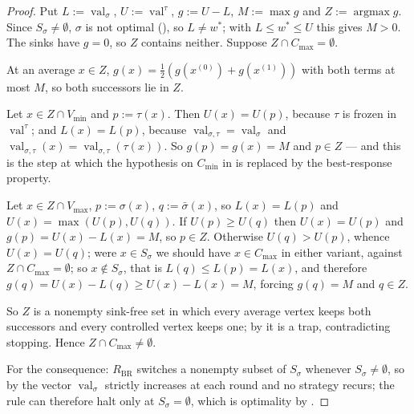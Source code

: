 \documentclass[11pt]{article}
\theoremstyle{plain}
\theoremstyle{definition}
\DeclareMathOperator{\val}{val}
\newcommand{\Vmax}{V_{\max}}
\newcommand{\Vmin}{V_{\min}}
\begin{document}
\begin{proof}
Put $L:=\val_\sigma$, $U:=\val^\tau$, $g:=U-L$, $M:=\max g$ and
$Z:=\operatorname{argmax}g$. Since $S_\sigma\ne\emptyset$, $\sigma$ is not
optimal (), so $L\ne w^\ast$; with
$L\le w^\ast\le U$ this gives $M>0$. The sinks have $g=0$, so $Z$ contains
neither. Suppose $Z\cap C_{\max}=\emptyset$.

At an average $x\in Z$, $g(x)=\tfrac12(g(x^{(0)})+g(x^{(1)}))$ with both
terms at most $M$, so both successors lie in $Z$.

Let $x\in Z\cap\Vmin$ and $p:=\tau(x)$. Then $U(x)=U(p)$, because $\tau$ is
frozen in $\val^\tau$; and $L(x)=L(p)$, because
$\val_{\sigma,\tau}=\val_\sigma$ and $\val_{\sigma,\tau}(x)=\val_{\sigma,\tau}(\tau(x))$.
So $g(p)=g(x)=M$ and $p\in Z$ --- and this is the step at which the
hypothesis on $C_{\min}$ in  is replaced by the
best-response property.

Let $x\in Z\cap\Vmax$, $p:=\sigma(x)$, $q:=\bar\sigma(x)$, so $L(x)=L(p)$
and $U(x)=\max(U(p),U(q))$. If $U(p)\ge U(q)$ then $U(x)=U(p)$ and
$g(p)=U(x)-L(x)=M$, so $p\in Z$. Otherwise $U(q)>U(p)$, whence
$U(x)=U(q)$; were $x\in S_\sigma$ we should have $x\in C_{\max}$ in either
variant, against $Z\cap C_{\max}=\emptyset$; so $x\notin S_\sigma$, that is
$L(q)\le L(p)=L(x)$, and therefore
$g(q)=U(x)-L(q)\ge U(x)-L(x)=M$, forcing $g(q)=M$ and $q\in Z$.

So $Z$ is a nonempty sink-free set in which every average vertex keeps both
successors and every controlled vertex keeps one; by  it
is a trap, contradicting stopping. Hence $Z\cap C_{\max}\ne\emptyset$.

For the consequence: $R_{\mathrm{BR}}$ switches a nonempty subset of
$S_\sigma$ whenever $S_\sigma\ne\emptyset$, so by  the
vector $\val_\sigma$ strictly increases at each round and no strategy
recurs; the rule can therefore halt only at $S_\sigma=\emptyset$, which is
optimality by .
\end{proof}
\end{document}
